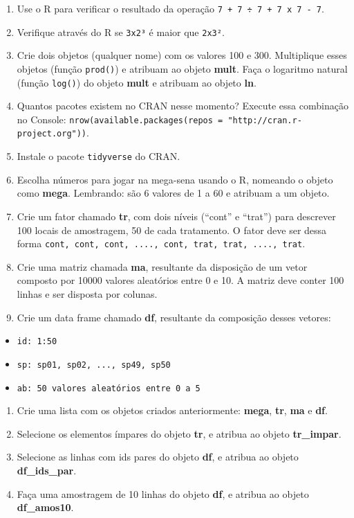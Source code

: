 \documentclass[
]{book}
\providecommand{\tightlist}{%
  \setlength{\itemsep}{0pt}\setlength{\parskip}{0pt}}
\begin{document}
\begin{enumerate}
\def\labelenumi{\arabic{enumi}.}
\item
  Use o R para verificar o resultado da operação \texttt{7\ +\ 7\ ÷\ 7\ +\ 7\ x\ 7\ -\ 7}.
\item
  Verifique através do R se \texttt{3x2³} é maior que \texttt{2x3²}.
\item
  Crie dois objetos (qualquer nome) com os valores 100 e 300. Multiplique esses objetos (função \texttt{prod()}) e atribuam ao objeto \textbf{mult}. Faça o logaritmo natural (função \texttt{log()}) do objeto \textbf{mult} e atribuam ao objeto \textbf{ln}.
\item
  Quantos pacotes existem no CRAN nesse momento? Execute essa combinação no Console: \texttt{nrow(available.packages(repos\ =\ "http://cran.r-project.org"))}.
\item
  Instale o pacote \texttt{tidyverse} do CRAN.
\item
  Escolha números para jogar na mega-sena usando o R, nomeando o objeto como \textbf{mega}. Lembrando: são 6 valores de 1 a 60 e atribuam a um objeto.
\item
  Crie um fator chamado \textbf{tr}, com dois níveis (``cont'' e ``trat'') para descrever 100 locais de amostragem, 50 de cada tratamento. O fator deve ser dessa forma \texttt{cont,\ cont,\ cont,\ ....,\ cont,\ trat,\ trat,\ ....,\ trat}.
\item
  Crie uma matriz chamada \textbf{ma}, resultante da disposição de um vetor composto por 10000 valores aleatórios entre 0 e 10. A matriz deve conter 100 linhas e ser disposta por colunas.
\item
  Crie um data frame chamado \textbf{df}, resultante da composição desses vetores:
\end{enumerate}

\begin{itemize}
\tightlist
\item
  \texttt{id:\ 1:50}
\item
  \texttt{sp:\ sp01,\ sp02,\ ...,\ sp49,\ sp50}
\item
  \texttt{ab:\ 50\ valores\ aleatórios\ entre\ 0\ a\ 5}
\end{itemize}

\begin{enumerate}
\def\labelenumi{\arabic{enumi}.}
\setcounter{enumi}{9}
\item
  Crie uma lista com os objetos criados anteriormente: \textbf{mega}, \textbf{tr}, \textbf{ma} e \textbf{df}.
\item
  Selecione os elementos ímpares do objeto \textbf{tr}, e atribua ao objeto \textbf{tr\_impar}.
\item
  Selecione as linhas com ids pares do objeto \textbf{df}, e atribua ao objeto \textbf{df\_ids\_par}.
\item
  Faça uma amostragem de 10 linhas do objeto \textbf{df}, e atribua ao objeto \textbf{df\_amos10}.
\end{enumerate}
\end{document}
